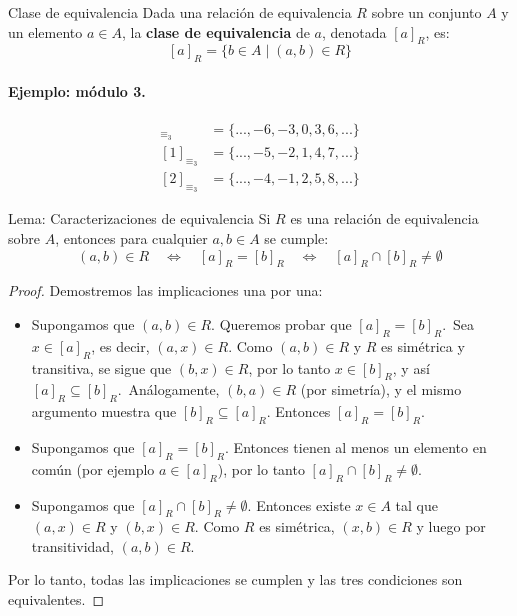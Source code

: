 \begin{definitionblock}{Clase de equivalencia}
Dada una relación de equivalencia $R$ sobre un conjunto $A$ y un elemento $a \in A$, la \textbf{clase de equivalencia} de $a$, denotada $[a]_R$, es:
\[
[a]_R = \{ b \in A \mid (a,b) \in R \}
\]
\end{definitionblock}

\paragraph{Ejemplo: módulo 3.}
\begin{align*}
[0]_{\equiv_3} &= \{ ..., -6, -3, 0, 3, 6, ... \} \\
[1]_{\equiv_3} &= \{ ..., -5, -2, 1, 4, 7, ... \} \\
[2]_{\equiv_3} &= \{ ..., -4, -1, 2, 5, 8, ... \}
\end{align*}

\begin{thmblock}{Lema: Caracterizaciones de equivalencia}  Si $R$ es una relación de equivalencia sobre $A$, entonces para cualquier $a, b \in A$ se cumple:
\[
(a,b) \in R \quad \Leftrightarrow \quad [a]_R = [b]_R \quad \Leftrightarrow \quad [a]_R \cap [b]_R \neq \emptyset
\]
\end{thmblock}
\begin{proof}
Demostremos las implicaciones una por una:

\begin{itemize}
  \item[$(1 \Rightarrow 2)$] Supongamos que $(a,b) \in R$. Queremos probar que $[a]_R = [b]_R$.\
  Sea $x \in [a]_R$, es decir, $(a,x) \in R$. Como $(a,b) \in R$ y $R$ es simétrica y transitiva, se sigue que $(b,x) \in R$, por lo tanto $x \in [b]_R$, y así $[a]_R \subseteq [b]_R$.\
  Análogamente, $(b,a) \in R$ (por simetría), y el mismo argumento muestra que $[b]_R \subseteq [a]_R$. Entonces $[a]_R = [b]_R$.

  \item[$(2 \Rightarrow 3)$] Supongamos que $[a]_R = [b]_R$. Entonces tienen al menos un elemento en común (por ejemplo $a \in [a]_R$), por lo tanto $[a]_R \cap [b]_R \neq \emptyset$.

  \item[$(3 \Rightarrow 1)$] Supongamos que $[a]_R \cap [b]_R \neq \emptyset$. Entonces existe $x \in A$ tal que $(a,x) \in R$ y $(b,x) \in R$. Como $R$ es simétrica, $(x,b) \in R$ y luego por transitividad, $(a,b) \in R$.
\end{itemize}
Por lo tanto, todas las implicaciones se cumplen y las tres condiciones son equivalentes.
\end{proof}


